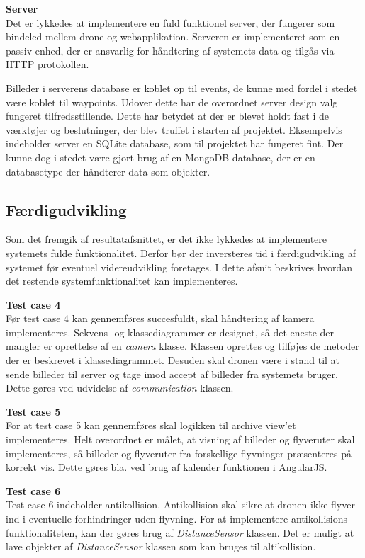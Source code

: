\newpage

\textbf{Server}\\
Det er lykkedes at implementere en fuld funktionel server, der fungerer som bindeled mellem drone og webapplikation. Serveren er implementeret som en passiv enhed, der er ansvarlig for håndtering af systemets data og tilgås via HTTP protokollen. 

Billeder i serverens database er koblet op til events, de kunne med fordel i stedet være koblet til waypoints. Udover dette har de overordnet server design valg fungeret tilfredsstillende. Dette har betydet at der er blevet holdt fast i de værktøjer og beslutninger, der blev truffet i starten af projektet. Eksempelvis indeholder server en SQLite database, som til projektet har fungeret fint. Der kunne dog i stedet være gjort brug af en MongoDB database, der er en databasetype der håndterer data som objekter.

\vspace{0.5cm}

\subsection{Færdigudvikling}

Som det fremgik af resultatafsnittet, er det ikke lykkedes at implementere systemets fulde funktionalitet. Derfor bør der inversteres tid i færdigudvikling af systemet før eventuel videreudvikling foretages. I dette afsnit beskrives hvordan det restende systemfunktionalitet kan implementeres. 

\textbf{Test case 4}  \\
Før test case 4 kan gennemføres succesfuldt, skal håndtering af kamera implementeres.
Sekvens- og klassediagrammer er designet, så det eneste der mangler er oprettelse af en \textit{camera} klasse. Klassen oprettes og tilføjes de metoder der er beskrevet i klassediagrammet. Desuden skal dronen være i stand til at sende billeder til server og tage imod accept af billeder fra systemets bruger. Dette gøres ved udvidelse af \textit{communication} klassen. 

\textbf{Test case 5} \\
For at test case 5 kan gennemføres skal logikken til archive view'et implementeres. 
Helt overordnet er målet, at visning af billeder og flyveruter skal implementeres, så billeder og flyveruter fra forskellige flyvninger præsenteres på korrekt vis. Dette gøres bla. ved brug af kalender funktionen i AngularJS. 

\textbf{Test case 6}\\
Test case 6 indeholder antikollision. Antikollision skal sikre at dronen ikke flyver ind i eventuelle forhindringer uden flyvning. For at implementere antikollisions funktionaliteten, kan der gøres brug af \textit{DistanceSensor} klassen. Det er muligt at lave objekter af \textit{DistanceSensor} klassen som kan bruges til altikollision. 

